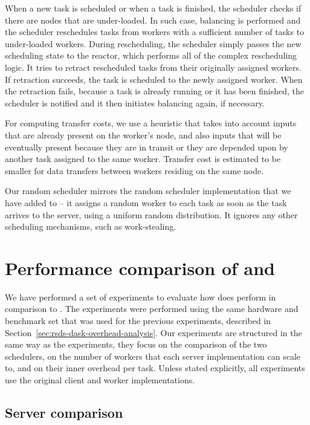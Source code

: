 When a new task is scheduled or when a task is finished, the scheduler checks if there are nodes
that are under-loaded. In such case, balancing is performed and the scheduler reschedules tasks
from workers with a sufficient number of tasks to under-loaded workers. During rescheduling, the
scheduler simply passes the new scheduling state to the reactor, which performs all of the complex
rescheduling logic. It tries to retract rescheduled tasks from their originally assigned workers.
If retraction succeeds, the task is scheduled to the newly assigned worker. When the retraction
fails, because a task is already running or it has been finished, the scheduler is notified and it
then initiates balancing again, if necessary.

For computing transfer costs, we use a heuristic that takes into account inputs that are already
present on the worker's node, and also inputs that will be eventually present because they are in
transit or they are depended upon by another task assigned to the same worker. Transfer cost is
estimated to be smaller for data transfers between workers residing on the same node.

Our random scheduler mirrors the random scheduler implementation that we have added to
\dask{} -- it assigns a random worker to each task as soon as the task arrives
to the server, using a uniform random distribution. It ignores any other scheduling mechanisms,
such as work-stealing.

\section{Performance comparison of \dask{} and \rsds{}}
\label{sec:rsds-dask-comparison}
We have performed a set of experiments to evaluate how does \rsds{} perform in
comparison to \dask{}. The experiments were performed using the same hardware
and benchmark set that was used for the previous \dask{} experiments, described
in Section~\ref{sec:rsds-dask-overhead-analysis}. Our experiments are structured in the same way as the
\dask{} experiments, they focus on the comparison of the two schedulers, on the
number of workers that each server implementation can scale to, and on their inner overhead per
task. Unless stated explicitly, all experiments use the original \dask{} client
and worker implementations.

\subsection*{Server comparison}

